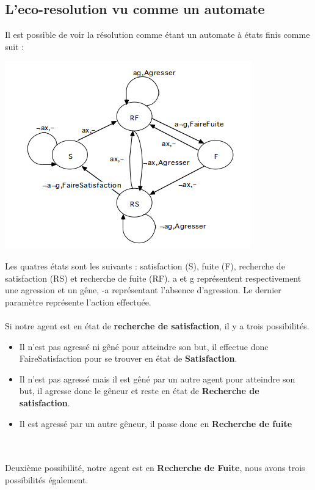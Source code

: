         \subsection{L'eco-resolution vu comme un automate}
        Il est possible de voir la résolution comme étant un automate à états finis comme suit : \\
\begin{center}
\includegraphics[scale=0.7]{diagrams/AutomateEcoResolution.png}
\end{center}
Les quatres états sont les suivants : satisfaction (S), fuite (F), recherche de satisfaction (RS) et recherche de fuite (RF). a et g représentent respectivement une agression et un gêne, -a représentant l'absence d'agression. Le dernier paramètre représente l'action effectuée. \\
\\
Si notre agent est en état de \textbf{recherche de satisfaction}, il y a trois possibilités. \\
\begin{itemize}
\item Il n'est pas agressé ni gêné pour atteindre son but, il effectue donc FaireSatisfaction pour se trouver en état de \textbf{Satisfaction}.
\item Il n'est pas agressé mais il est gêné par un autre agent pour atteindre son but, il agresse donc le gêneur et reste en état de \textbf{Recherche de satisfaction}.
\item Il est agressé par un autre gêneur, il passe donc en \textbf{Recherche de fuite}
\end{itemize} ~\\
~\\
Deuxième possibilité, notre agent est en \textbf{Recherche de Fuite}, nous avons trois possibilités également. \\
